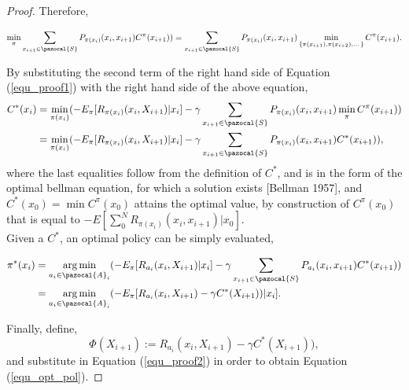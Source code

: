 \documentclass[12pt,aas_macros]{article}
\theoremstyle{definition}
\DeclareMathOperator*{\argmin}{arg\,min}
\begin{document}
\begin{proof}
Therefore,

\begin{equation*}
 \min_{\pi} \sum_{x_{i+1} \in \pazocal{S}} P_{\pi(x_{i})}(x_{i},x_{i+1}) C^{\pi}({x_{{i+1}}}))=\sum_{x_{i+1} \in \pazocal{S}} P_{\pi(x_{i})}(x_{i},x_{i+1}) \min_{\{\pi(x_{i+1}), \pi(x_{{i+2}}),\dots \}} C^{\pi}({x_{{i+1}}}).
\end{equation*}

By substituting the second term of the right hand side of Equation (\ref{equ_proof1}) with the right hand side of the above equation,
\begin{equation*}
\begin{aligned}
C^{*}(x_{{i}}) &= \min_{\pi(x_{i})} (- E_{\pi}[R_{\pi(x_i)}(x_{i}, X_{{i+1}}) | x_{i}] -\gamma \sum_{x_{i+1} \in \pazocal{S}} P_{\pi(x_i)}(x_{i},x_{i+1}) \min_{\pi} C^{\pi}({x_{{i+1}}}))\\
&= \min_{\pi(x_{i})} (- E_{\pi}[R_{\pi(x_i)}(x_{i}, X_{{i+1}}) | x_{i}] -\gamma \sum_{x_{i+1} \in \pazocal{S}} P_{\pi(x_i)}(x_{i},x_{i+1}) C^*({x_{{i+1}}})),\\
\end{aligned}
\end{equation*}
where the last equalities follow from the definition of $C^*$, and is in the form of the optimal bellman equation, for which a solution exists [Bellman 1957], and $C^*(x_0) = \min{C^\pi(x_0)}$ attains the optimal value, by construction of $C^\pi(x_0)$ that is equal to $- E[\sum_{0}^N R_{\pi(x_i)}(x_{{i}}, x_{i+1}) | x_0]$.\\

Given a $C^*$, an optimal policy can be simply evaluated,

\begin{equation}\label{equ_proof2}
\begin{aligned}
\pi^*(x_{i}) & = \argmin_{a_{i} \in \pazocal{A}_i} (- E_{\pi}[R_{a_i}(x_{{i}}, X_{i+1}) | x_{i}] -\gamma \sum_{x_{i+1} \in \pazocal{S}} P_{a_i}(x_{i},x_{i+1})C^*({x_{{i+1}}}))\\
& = \argmin_{a_{i} \in \pazocal{A}_i} (- E_{\pi}[R_{a_i}(x_{{i}}, X_{i+1}) - \gamma C^*({X_{{i+1}}}))| x_{i}].\\
\end{aligned}
\end{equation}

Finally, define,
\begin{equation}\label{equ_phi}
\Phi(X_{{i+1}}) := R_{a_i}(x_{{i}}, X_{i+1}) - \gamma C^*({X_{{i+1}}})),
\end{equation}
 and substitute in Equation (\ref{equ_proof2}) in order to obtain Equation (\ref{equ_opt_pol}).
\end{proof}
\end{document}
